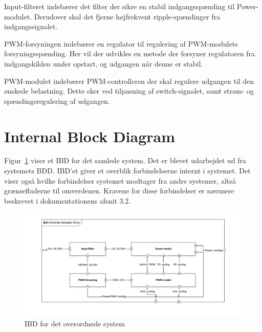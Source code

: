 Input-filteret indebærer det filter der sikre en stabil indgangsspænding til Power-modulet. Derudover skal det fjerne højfrekvent ripple-spændinger fra indgangssignalet. 

\noindent PWM-forsyningen indebærer en regulator til regulering af PWM-modulets forsyningsspænding. Her vil der udvikles en metode der forsyner regulatoren fra indgangskilden under opstart, og udgangen når denne er stabil.

PWM-modulet indebærer PWM-controlleren der skal regulere udgangen til den ønskede belastning. Dette sker ved tilpasning af switch-signalet, samt strøm- og spændingsregulering af udgangen.

\section{Internal Block Diagram}
Figur~\ref{fig:IBD} viser et IBD for det samlede system. Det er blevet udarbejdet ud fra systemets BDD. IBD'et giver et overblik forbindelserne internt i systemet. Det viser også hvilke forbindelser systemet modtager fra andre systemer, altså grænsefladerne til omverdenen. Kravene for disse forbindelser er nærmere beskrevet i dokumentationens afsnit 3.2.

\begin{figure}[H]
	\centering
	\includegraphics[width=1\linewidth]{../Dokumentation/tex/systemarkitektur/billeder/IBD.pdf}
	\caption{IBD for det overordnede system}
	\label{fig:IBD}
\end{figure}